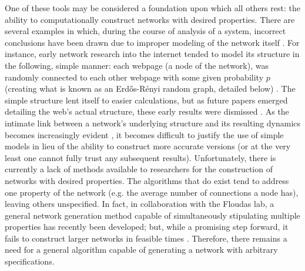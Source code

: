 \documentclass[11pt]{article}
\begin{document}
One of these tools may be considered a foundation upon which all others rest: the ability to computationally construct networks with desired properties. There are several examples in which, during the course of analysis of a system, incorrect conclusions have been drawn due to improper modeling of the network itself \cite{theinternetisscalefree,smallworld,etc.}. For instance, early network research into the internet tended to model its structure in the following, simple manner: each webpage (a node of the network), was randomly connected to each other webpage with some given probability $p$ (creating what is known as an Erd\H{o}s-R\'{e}nyi random graph, detailed below) \cite{stochastic_models_webgraph}. The simple structure lent itself to easier calculations, but as future papers emerged detailing the web's actual structure, these early results were dismissed \cite{something,hopefully}. As the intimate link between a network's underlying structure and its resulting dynamics becomes increasingly evident \cite{barbasi,scalefree}, it becomes difficult to justify the use of simple models in lieu of the ability to construct more accurate versions (or at the very least one cannot fully trust any subsequent results). Unfortunately, there is currently a lack of methods available to researchers for the construction of networks with desired properties. The algorithms that do exist tend to address one property of the network (e.g. the average number of connections a node has), leaving others unspecified. In fact, in collaboration with the Floudas lab, a general network generation method capable of simultaneously stipulating multiple properties has recently been developed; but, while a promising step forward, it fails to construct larger networks in feasible times \cite{karthiksoptimizationpaper}. Therefore, there remains a need for a general algorithm capable of generating a network with arbitrary specifications.\vspace{1mm}\\
\end{document}
